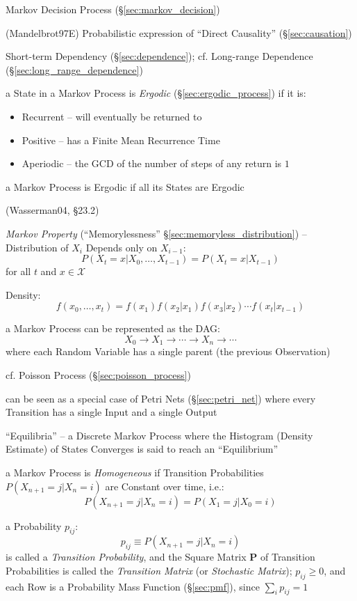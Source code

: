 \fist Markov Decision Process (\S\ref{sec:markov_decision})

(Mandelbrot97E) Probabilistic expression of ``Direct Causality''
(\S\ref{sec:causation})

Short-term Dependency (\S\ref{sec:dependence}); cf. Long-range Dependence
(\S\ref{sec:long_range_dependence})

a State in a Markov Process is \emph{Ergodic} (\S\ref{sec:ergodic_process}) if
it is:
\begin{itemize}
  \item Recurrent -- will eventually be returned to
  \item Positive -- has a Finite Mean Recurrence Time
  \item Aperiodic -- the GCD of the number of steps of any return is $1$
\end{itemize}
a Markov Process is Ergodic if all its States are Ergodic


(Wasserman04, \S23.2)

\emph{Markov Property} (``Memorylessness'' \S\ref{sec:memoryless_distribution})
-- Distribution of $X_i$ Depends only on $X_{i-1}$:
\[
  P(X_t = x | X_0, \ldots, X_{t-1}) = P(X_t = x | X_{t-1})
\]
for all $t$ and $x \in \mathcal{X}$

Density:
\[
  f(x_0, \ldots, x_t) = f(x_1)f(x_2|x_1)f(x_3|x_2) \cdots f(x_t|x_{t-1})
\]

a Markov Process can be represented as the DAG:
\[
  X_0 \longrightarrow X_1 \longrightarrow \cdots \longrightarrow X_n
    \longrightarrow \cdots
\]
where each Random Variable has a single parent (the previous Observation)

cf. Poisson Process (\S\ref{sec:poisson_process})

\fist can be seen as a special case of Petri Nets (\S\ref{sec:petri_net}) where
every Transition has a single Input and a single Output

``Equilibria'' -- a Discrete Markov Process where the Histogram (Density
Estimate) of States Converges is said to reach an ``Equilibrium''

a Markov Process is \emph{Homogeneous} if Transition Probabilities
$P(X_{n+1} = j | X_n = i)$ are Constant over time, i.e.:
\[
  P(X_{n+1} = j | X_n = i) = P(X_1 = j| X_0 = i)
\]

a Probability $p_{ij}$:
\[
  p_{ij} \equiv P(X_{n+1} = j | X_n = i)
\]
is called a \emph{Transition Probability}, and the Square Matrix $\mathbf{P}$ of
Transition Probabilities is called the \emph{Transition Matrix} (or
\emph{Stochastic Matrix});
$p_{ij} \geq 0$, and each Row is a Probability Mass Function (\S\ref{sec:pmf}),
since $\sum_i p_{ij} = 1$

